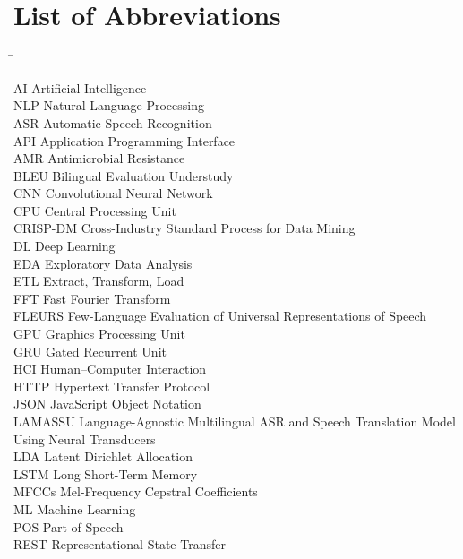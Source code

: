 \chapter*{List of Abbreviations}

\begin{tabbing}
\hspace{6.2cm}\=\kill

AI \> Artificial Intelligence \\
NLP \> Natural Language Processing \\
ASR \> Automatic Speech Recognition \\
API \> Application Programming Interface \\
AMR \> Antimicrobial Resistance \\
BLEU \> Bilingual Evaluation Understudy \\
CNN \> Convolutional Neural Network \\
CPU \> Central Processing Unit \\
CRISP-DM \> Cross-Industry Standard Process for Data Mining \\
DL \> Deep Learning \\
EDA \> Exploratory Data Analysis \\
ETL \> Extract, Transform, Load \\
FFT \> Fast Fourier Transform \\
FLEURS \> Few-Language Evaluation of Universal Representations of Speech \\
GPU \> Graphics Processing Unit \\
GRU \> Gated Recurrent Unit \\
HCI \> Human--Computer Interaction \\
HTTP \> Hypertext Transfer Protocol \\
JSON \> JavaScript Object Notation \\
LAMASSU \> Language-Agnostic Multilingual ASR and Speech Translation Model Using Neural Transducers \\
LDA \> Latent Dirichlet Allocation \\
LSTM \> Long Short-Term Memory \\
MFCCs \> Mel-Frequency Cepstral Coefficients \\
ML \> Machine Learning \\
POS \> Part-of-Speech \\
REST \> Representational State Transfer \\

\end{tabbing}
